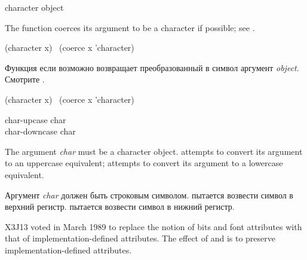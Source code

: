 \begin{defun}[Function]
character object

The function  coerces its argument to be a character
if possible; see .
\begin{lisp}
(character x) \EQ\ (coerce x 'character)
\end{lisp}

Функция  если возможно возвращает преобразованный в символ
аргумент \emph{object}. Смотрите .
\begin{lisp}
(character x) \EQ\ (coerce x 'character)
\end{lisp}
\end{defun}


\begin{defun}[Function]
char-upcase char \\
char-downcase char

The argument \emph{char} must be a character object.
 attempts to convert its argument to an uppercase
equivalent;  attempts to convert its argument
to a lowercase equivalent.

Аргумент \emph{char} должен быть строковым символом.
 пытается возвести символ в верхний
регистр.  пытается возвести символ в нижний регистр.
\begin{newer}
X3J13 voted in March 1989 
to replace the notion of bits and font attributes with
that of implementation-defined attributes.  The effect of
 and  is to preserve
implementation-defined attributes.
\end{newer}

\end{defun}

